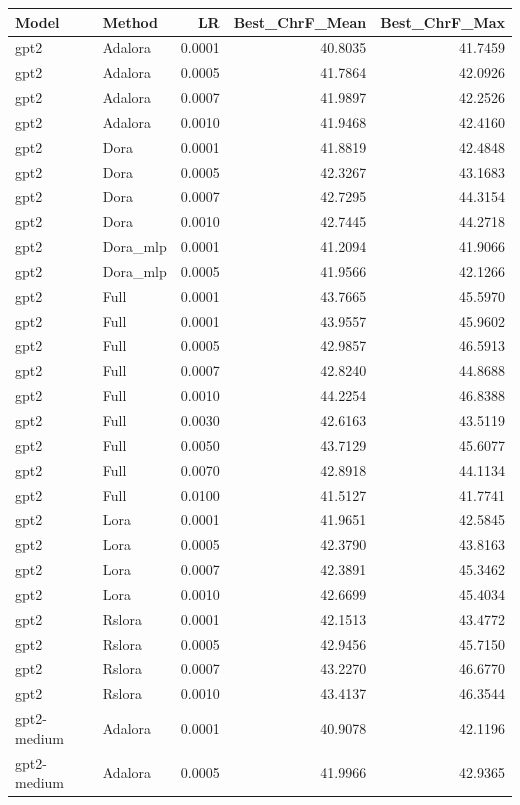 \begin{tabular}{llrrr}
\toprule
Model & Method & LR & Best_ChrF_Mean & Best_ChrF_Max \\
\midrule
gpt2 & Adalora & 0.0001 & 40.8035 & 41.7459 \\
gpt2 & Adalora & 0.0005 & 41.7864 & 42.0926 \\
gpt2 & Adalora & 0.0007 & 41.9897 & 42.2526 \\
gpt2 & Adalora & 0.0010 & 41.9468 & 42.4160 \\
gpt2 & Dora & 0.0001 & 41.8819 & 42.4848 \\
gpt2 & Dora & 0.0005 & 42.3267 & 43.1683 \\
gpt2 & Dora & 0.0007 & 42.7295 & 44.3154 \\
gpt2 & Dora & 0.0010 & 42.7445 & 44.2718 \\
gpt2 & Dora_mlp & 0.0001 & 41.2094 & 41.9066 \\
gpt2 & Dora_mlp & 0.0005 & 41.9566 & 42.1266 \\
gpt2 & Full & 0.0001 & 43.7665 & 45.5970 \\
gpt2 & Full & 0.0001 & 43.9557 & 45.9602 \\
gpt2 & Full & 0.0005 & 42.9857 & 46.5913 \\
gpt2 & Full & 0.0007 & 42.8240 & 44.8688 \\
gpt2 & Full & 0.0010 & 44.2254 & 46.8388 \\
gpt2 & Full & 0.0030 & 42.6163 & 43.5119 \\
gpt2 & Full & 0.0050 & 43.7129 & 45.6077 \\
gpt2 & Full & 0.0070 & 42.8918 & 44.1134 \\
gpt2 & Full & 0.0100 & 41.5127 & 41.7741 \\
gpt2 & Lora & 0.0001 & 41.9651 & 42.5845 \\
gpt2 & Lora & 0.0005 & 42.3790 & 43.8163 \\
gpt2 & Lora & 0.0007 & 42.3891 & 45.3462 \\
gpt2 & Lora & 0.0010 & 42.6699 & 45.4034 \\
gpt2 & Rslora & 0.0001 & 42.1513 & 43.4772 \\
gpt2 & Rslora & 0.0005 & 42.9456 & 45.7150 \\
gpt2 & Rslora & 0.0007 & 43.2270 & 46.6770 \\
gpt2 & Rslora & 0.0010 & 43.4137 & 46.3544 \\
gpt2-medium & Adalora & 0.0001 & 40.9078 & 42.1196 \\
gpt2-medium & Adalora & 0.0005 & 41.9966 & 42.9365 \\

\end{tabular}
